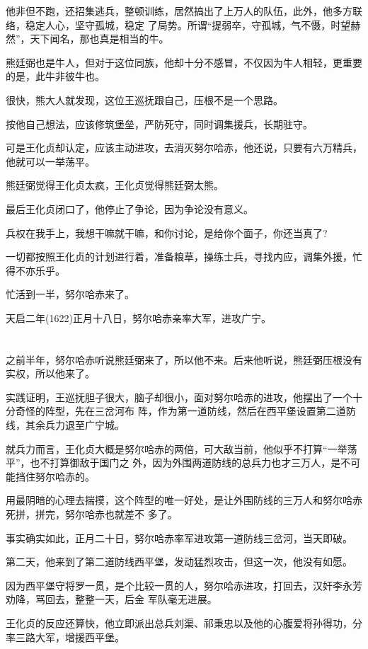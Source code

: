 \documentclass[11pt,a4paper,onecolumn]{article}
\begin{document}
他非但不跑，还招集逃兵，整顿训练，居然搞出了上万人的队伍，此外，他多方联络，稳定人心，坚守孤城，稳定
了局势。所谓``提弱卒，守孤城，气不慑，时望赫然''，天下闻名，那也真是相当的牛。

熊廷弼也是牛人，但对于这位同族，他却十分不感冒，不仅因为牛人相轻，更重要的是，此牛非彼牛也。

很快，熊大人就发现，这位王巡抚跟自己，压根不是一个思路。

按他自己想法，应该修筑堡垒，严防死守，同时调集援兵，长期驻守。

可是王化贞却认定，应该主动进攻，去消灭努尔哈赤，他还说，只要有六万精兵，他就可以一举荡平。

熊廷弼觉得王化贞太疯，王化贞觉得熊廷弼太熊。

最后王化贞闭口了，他停止了争论，因为争论没有意义。

兵权在我手上，我想干嘛就干嘛，和你讨论，是给你个面子，你还当真了?

一切都按照王化贞的计划进行着，准备粮草，操练士兵，寻找内应，调集外援，忙得不亦乐乎。

忙活到一半，努尔哈赤来了。

天启二年(1622)正月十八日，努尔哈赤亲率大军，进攻广宁。

\section[\thesection]{}

之前半年，努尔哈赤听说熊廷弼来了，所以他不来。后来他听说，熊廷弼压根没有实权，所以他来了。

实践证明，王巡抚胆子很大，脑子却很小，面对努尔哈赤的进攻，他摆出了一个十分奇怪的阵型，先在三岔河布
阵，作为第一道防线，然后在西平堡设置第二道防线，其余兵力退至广宁城。

就兵力而言，王化贞大概是努尔哈赤的两倍，可大敌当前，他似乎不打算``一举荡平''，也不打算御敌于国门之
外，因为外围两道防线的总兵力也才三万人，是不可能挡住努尔哈赤的。

用最阴暗的心理去揣摸，这个阵型的唯一好处，是让外围防线的三万人和努尔哈赤死拼，拼完，努尔哈赤也就差不
多了。

事实确实如此，正月二十日，努尔哈赤率军进攻第一道防线三岔河，当天即破。

第二天，他来到了第二道防线西平堡，发动猛烈攻击，但这一次，他没有如愿。

因为西平堡守将罗一贯，是个比较一贯的人，努尔哈赤进攻，打回去，汉奸李永芳劝降，骂回去，整整一天，后金
军队毫无进展。

王化贞的反应还算快，他立即派出总兵刘渠、祁秉忠以及他的心腹爱将孙得功，分率三路大军，增援西平堡。
\end{document}
